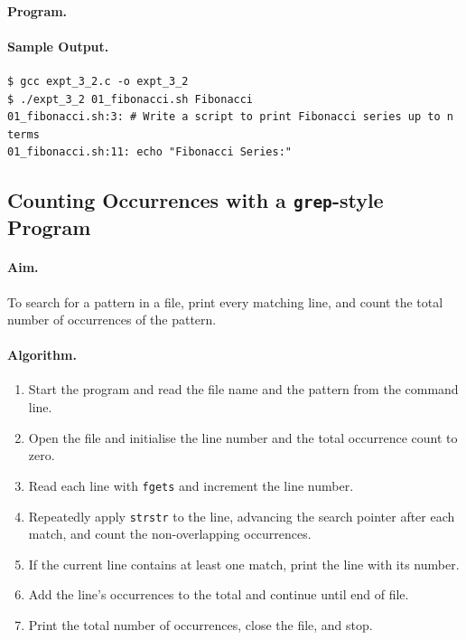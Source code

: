 \paragraph{Program.}


\paragraph{Sample Output.}
\begin{lstlisting}[style=outputstyle, caption={Searching for the word \texttt{Fibonacci} in a file}]
$ gcc expt_3_2.c -o expt_3_2
$ ./expt_3_2 01_fibonacci.sh Fibonacci
01_fibonacci.sh:3: # Write a script to print Fibonacci series up to n
terms
01_fibonacci.sh:11: echo "Fibonacci Series:"
\end{lstlisting}

\subsection{Counting Occurrences with a \texttt{grep}-style Program}

\paragraph{Aim.}
To search for a pattern in a file, print every matching line, and count the total number of occurrences of the pattern.

\paragraph{Algorithm.}
\begin{enumerate}
    \item Start the program and read the file name and the pattern from the command line.
    \item Open the file and initialise the line number and the total occurrence count to zero.
    \item Read each line with \texttt{fgets} and increment the line number.
    \item Repeatedly apply \texttt{strstr} to the line, advancing the search pointer after each match, and count the non-overlapping occurrences.
    \item If the current line contains at least one match, print the line with its number.
    \item Add the line's occurrences to the total and continue until end of file.
    \item Print the total number of occurrences, close the file, and stop.
\end{enumerate}

